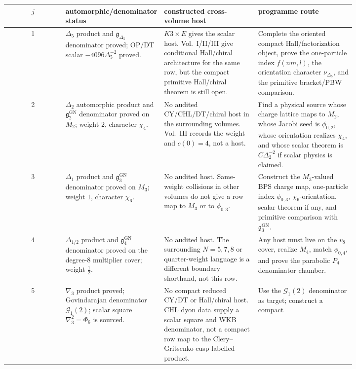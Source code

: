 \begin{center}
\small
\begin{tabular}{c|p{0.26\linewidth}|p{0.27\linewidth}|p{0.29\linewidth}}
\(j\)&automorphic/denominator status&
constructed cross-volume host&
programme route\\ \hline
1&
\(\Delta_5\) product and
\(\mathfrak g_{\Delta_5}\) denominator proved; OP/DT scalar
\(-4096\Delta_5^{-2}\) proved.&
\(K3\times E\) gives the scalar host.  Vol.~I/II/III give conditional
Hall/chiral architecture for the same row, but the compact primitive
Hall/chiral theorem is still open.&
Complete the oriented compact Hall/factorization object, prove the
one-particle index \(f(nm,l)\), the orientation character
\(\nu_{\Delta_5}\), and the primitive bracket/PBW comparison.\\ \hline
2&
\(\Delta_2\) automorphic product and
\(\mathfrak g^{\mathrm{GN}}_2\) denominator proved on \(M_2\);
weight \(2\), character \(\chi_4\).&
No audited CY/CHL/DT/chiral host in the surrounding volumes.  Vol.~III
records the weight and \(c(0)=4\), not a host.&
Find a physical source whose charge lattice maps to \(M_2\), whose
Jacobi seed is \(\phi_{0,2}\), whose orientation realizes \(\chi_4\),
and whose scalar theorem is \(C\Delta_2^{-2}\) if scalar physics is
claimed.\\ \hline
3&
\(\Delta_1\) product and \(\mathfrak g^{\mathrm{GN}}_3\) denominator
proved on \(M_3\); weight \(1\), character \(\chi_6\).&
No audited host.  Same-weight collisions in other volumes do not give
a row map to \(M_3\) or to \(\phi_{0,3}\).&
Construct the \(M_3\)-valued BPS charge map, one-particle index
\(\phi_{0,3}\), \(\chi_6\)-orientation, scalar theorem if any, and
primitive comparison with \(\mathfrak g^{\mathrm{GN}}_3\).\\ \hline
4&
\(\Delta_{1/2}\) product and \(\mathfrak g^{\mathrm{GN}}_4\)
denominator proved on the degree-\(8\) multiplier cover; weight
\(\tfrac12\).&
No audited host.  The surrounding \(N=5,7,8\) or quarter-weight
language is a different boundary shorthand, not this row.&
Any host must live on the \(v_8\) cover, realize \(M_4\), match
\(\phi_{0,4}\), and prove the parabolic \(P_4\) denominator chamber.\\
\hline
5&
\(\nabla_3\) product proved; Govindarajan denominator
\(\mathcal G_1(2)\); scalar square \(\nabla_3^2=\Phi_6\) is sourced.&
No compact reduced CY/DT or Hall/chiral host.  CHL dyon data supply a
scalar square and WKB denominator, not a compact row map to the
Clery--Gritsenko cusp-labelled product.&
Use the \(\mathcal G_1(2)\) denominator as target; construct a compact

\end{tabular}
\end{center}
